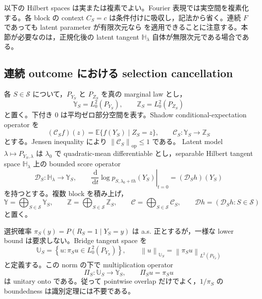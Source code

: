 \documentclass[11pt,a4paper]{ltjsarticle}
\theoremstyle{remark}
\newcommand{\E}{\mathbb E}
\newcommand{\dd}{\,\mathrm d}
\newcommand{\norm}[1]{\left\lVert#1\right\rVert}
\newcommand{\cS}{\mathcal S}
\newcommand{\Cop}{\mathscr C}
\newcommand{\Jcal}{\mathscr D}
\newcommand{\op}{\operatorname{op}}
\begin{document}
以下の Hilbert spaces は実または複素でよい。Fourier 表現では実空間を複素化する。各 block の context $C_S=c$ は条件付けに吸収し，記法から省く。連続 $F$ であっても latent parameter が有限次元なら  を適用できることに注意する。本節が必要なのは，正規化後の latent tangent $\mathbb H_\lambda$ 自体が無限次元である場合である。

\subsection{連続 outcome における selection cancellation}

各 $S\in\cS$ について，$P_{Y_S}$ と $P_{Z_S}$ を真の marginal law とし，
\[
\mathbb Y_S=L^2_0(P_{Y_S}),
\qquad
\mathbb Z_S=L^2_0(P_{Z_S})
\]
と置く。下付き $0$ は平均ゼロ部分空間を表す。Shadow conditional-expectation operator を
\begin{equation}
(\Cop_S f)(z)=\E\{f(Y_S)\mid Z_S=z\},
\qquad
\Cop_S:\mathbb Y_S\to\mathbb Z_S
\label{eq:Cconditional}
\end{equation}
とする。Jensen inequality により $\norm{\Cop_S}_{\op}\le1$ である。
Latent model $\lambda\mapsto P_{Y_S,\lambda}$ は $\lambda_0$ で quadratic-mean differentiable とし，separable Hilbert tangent space $\mathbb H_\lambda$ 上の bounded score operator
\begin{equation}
\Jcal_S:\mathbb H_\lambda\to\mathbb Y_S,
\qquad
\left.\frac{\dd}{\dd t}\log p_{S,\lambda_0+th}(Y_S)\right|_{t=0}
=(\Jcal_Sh)(Y_S)
\label{eq:Jscorecontinuous}
\end{equation}
を持つとする。複数 block を積み上げ，
\[
\mathbb Y=\bigoplus_{S\in\cS}\mathbb Y_S,
\qquad
\mathbb Z=\bigoplus_{S\in\cS}\mathbb Z_S,
\qquad
\Cop=\bigoplus_{S\in\cS}\Cop_S,
\qquad
\Jcal h=(\Jcal_Sh:S\in\cS)
\]
と置く。

選択確率 $\pi_S(y)=P(R_S=1\mid Y_S=y)$ は a.s. 正とするが，一様な lower bound は要求しない。Bridge tangent space を
\begin{equation}
\mathbb U_S
=\left\{u:\pi_Su\in L^2_0(P_{Y_S})\right\},
\qquad
\norm{u}_{\mathbb U_S}=\norm{\pi_Su}_{L^2(P_{Y_S})}
\label{eq:weightedbridgespace}
\end{equation}
と定義する。この norm の下で multiplication operator
\[
\Pi_S:\mathbb U_S\to\mathbb Y_S,
\qquad
\Pi_Su=\pi_Su
\]
は unitary onto である。従って pointwise overlap だけでよく，$1/\pi_S$ の boundedness は識別定理には不要である。
\end{document}
